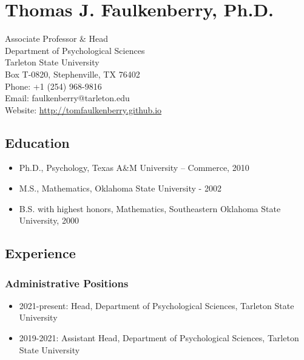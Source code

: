 \documentclass[article,10pt]{article}
\date{\today}
\title{}
\begin{document}
\section*{Thomas J. Faulkenberry, Ph.D.}
\label{sec:org8fcb767}

Associate Professor \& Head\\[0pt]
Department of Psychological Sciences\\[0pt]
Tarleton State University\\[0pt]
Box T-0820, Stephenville, TX 76402\\[0pt]
Phone: +1 (254) 968-9816\\[0pt]
Email: faulkenberry@tarleton.edu\\[0pt]
Website: \url{http://tomfaulkenberry.github.io}

\subsection*{Education}
\label{sec:orgd21b8c1}
\begin{itemize}
\item Ph.D., Psychology, Texas A\&M University – Commerce, 2010
\item M.S., Mathematics, Oklahoma State University - 2002
\item B.S. with highest honors, Mathematics, Southeastern Oklahoma State University, 2000
\end{itemize}

\subsection*{Experience}
\label{sec:org1945704}
\subsubsection*{Administrative Positions}
\label{sec:orgcda2681}
\begin{itemize}
\item 2021-present: Head, Department of Psychological Sciences, Tarleton State University
\item 2019-2021: Assistant Head, Department of Psychological Sciences, Tarleton State University
\end{itemize}
\end{document}
